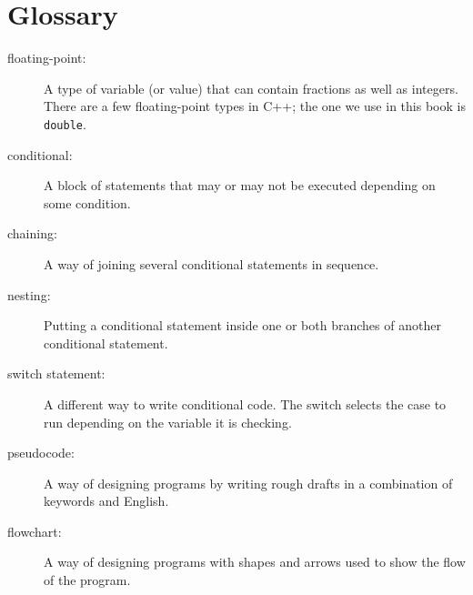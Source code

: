 
\section{Glossary}

\begin{description}
\item[floating-point:] A type of variable (or value) that can contain
fractions as well as integers.  There are a few floating-point types
in C++; the one we use in this book is {\tt double}.

\item[conditional:]  A block of statements that may or may not
be executed depending on some condition.

\item[chaining:]  A way of joining several conditional statements
in sequence.

\item[nesting:] Putting a conditional statement inside one or both
branches of another conditional statement.

\item[switch statement:] A different way to write conditional code. The switch selects the case to run depending on the variable it is checking.

\item[pseudocode:]  A way of designing programs by writing
rough drafts in a combination of keywords and English.

\item[flowchart:] A way of designing programs with shapes and arrows used to show the flow of the program. 


\end{description}


